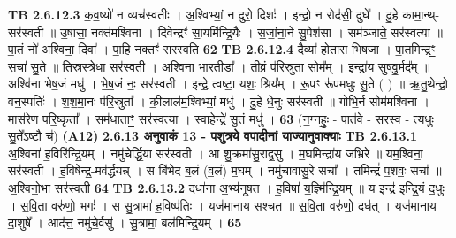 \documentclass[17pt]{extarticle}
\begin{document}
                  \newline
                                \textbf{ TB 2.6.12.3} \newline
                  क॒व॒ष्यो॑ न व्यच॑स्वतीः । अ॒श्विभ्यां॒ न दुरो॒ दिशः॑ । इन्द्रो॒ न रोद॑सी॒ दुघे᳚ । दु॒हे कामा॒न्थ्-सर॑स्वती ॥ उ॒षासा॒ नक्त॑मश्विना । दिवेन्द्रꣳ॑ सा॒यमि॑न्द्रि॒यैः । स॒जां॒ना॒ने सु॒पेश॑सा । सम॑ञ्जाते॒ सर॑स्वत्या ॥ पा॒तं नो॑ अश्विना॒ दिवा᳚ । पा॒हि नक्तꣳ॑ सरस्वति \textbf{ 62} \newline
                  \newline
                                \textbf{ TB 2.6.12.4} \newline
                  दैव्या॑ होतारा भिषजा । पा॒तमिन्द्रꣳ॒॒ सचा॑ सु॒ते ॥ ति॒स्रस्त्रे॒धा सर॑स्वती । अ॒श्विना॒ भार॒तीडा᳚ । ती॒व्रं प॑रि॒स्रुता॒ सोम᳚म् । इन्द्रा॑य सुषवु॒र्मद᳚म् ॥ अश्वि॑ना भेष॒जं मधु॑ । भे॒ष॒जं नः॒ सर॑स्वती । इन्द्रे॒ त्वष्टा॒ यशः॒ श्रिय᳚म् । रू॒पꣳ रू॑पमधुः सु॒ते ( ) ॥ ऋ॒तु॒थेन्द्रो॒ वन॒स्पतिः॑ । श॒श॒मा॒नः प॑रि॒स्रुता᳚ । की॒लाल॑म॒श्विभ्यां॒ मधु॑ । दु॒हे धे॒नुः सर॑स्वती ॥ गोभि॒र्न सोम॑मश्विना । मास॑रेण परि॒ष्कृता᳚ । सम॑धाताꣳ॒॒ सर॑स्वत्या । स्वाहेन्द्रे॑ सु॒तं मधु॑ । \textbf{ 63} \newline
                  \newline
                                    (न॒ग्नहुः॒ - पात॑वे - सरस्व - त्यधुः सु॒ते᳚ऽष्टौ च॑) \textbf{(A12)} \newline \newline
                \textbf{ 2.6.13    अनुवाकं   13 - पशुत्रये वपादीनां याज्यानुवाक्याः} \newline
                                \textbf{ TB 2.6.13.1} \newline
                  अ॒श्विना॑ ह॒विरि॑न्द्रि॒यम् । नमु॑चेर्द्धि॒या सर॑स्वती । आ शु॒क्रमा॑सु॒राद्व॒सु । म॒घमिन्द्रा॑य जभ्रिरे ॥ यम॒श्विना॒ सर॑स्वती । ह॒विषेन्द्र॒-मव॑र्द्धयन्न् । स बि॑भेद ब॒लं (व॒लं) म॒घम् । नमु॑चावासु॒रे सचा᳚ । तमिन्द्रं॑ प॒शवः॒ सचा᳚ ॥ अ॒श्विनो॒भा सर॑स्वती \textbf{ 64} \newline
                  \newline
                                \textbf{ TB 2.6.13.2} \newline
                  दधा॑ना अ॒भ्य॑नूषत । ह॒विषा॑ य॒ज्ञ्मि॑न्द्रि॒यम् ॥ य इन्द्र॑ इन्द्रि॒यं द॒धुः । स॒वि॒ता वरु॑णो॒ भगः॑ । स सु॒त्रामा॑ ह॒विष्प॑तिः । यज॑मानाय सश्चत ॥ स॒वि॒ता वरु॑णो॒ दध॑त् । यज॑मानाय दा॒शुषे᳚ । आद॑त्त॒ नमु॑चे॒र्वसु॑ । सु॒त्रामा॒ बल॑मिन्द्रि॒यम् । \textbf{ 65} \newline
                  \newline
\end{document}
